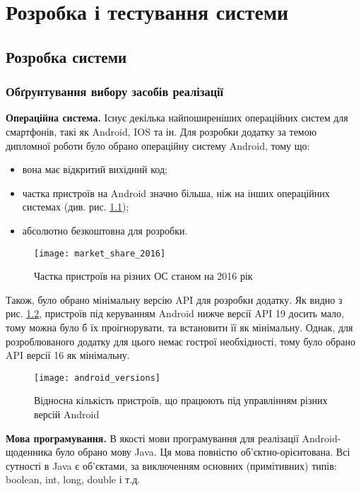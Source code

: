 \documentclass[../main.tex]{subfiles}
\begin{document}
	
\chapter{Розробка і тестування системи}
	
\section{Розробка  системи}
	
\subsection{Обґрунтування вибору засобів реалізації}

\textbf{Операційна система.}
Існує декілька найпоширеніших операційних систем для смартфонів, такі як Android, IOS та ін. Для розробки додатку за темою дипломної роботи було обрано операційну систему Android, тому що: 
\begin{itemize}[label={--}]
	\item вона має відкритий вихідний код;
	\item частка пристроїв на Android значно більша, ніж на інших операційних системах (див. рис. \ref{chart:market_share});
	\item абсолютно безкоштовна для розробки.
\end{itemize}

\begin{figure}[H]
	\centering
	\texttt{[image: market\_share\_2016]}
	\caption{Частка пристроїв на різних ОС станом на 2016 рік}
	\label{chart:market_share}
\end{figure}

Також, було обрано мінімальну версію API для розробки додатку. Як видно з рис. \ref{chart:android_versions}, пристроїв під керуванням Android нижче версії API 19 досить мало, тому можна було б їх проігнорувати, та встановити її як мінімальну. Однак, для розроблюваного додатку для цього немає гострої необхідності, тому було обрано API версії 16 як мінімальну.\\

\begin{figure}[H]
	\centering
	\texttt{[image: android\_versions]}
	\caption{Відносна кількість пристроїв, що працюють під управлінням різних версій Android}
	\label{chart:android_versions}
\end{figure}

\textbf{Мова програмування.} 
В якості мови програмування для реалізації Android-щоденника було обрано мову Java. Ця мова повністю об'єктно-орієнтована. Всі сутності в Java є об'єктами, за виключенням основних (примітивних) типів: boolean, int, long, double і т.д. 
\end{document}
